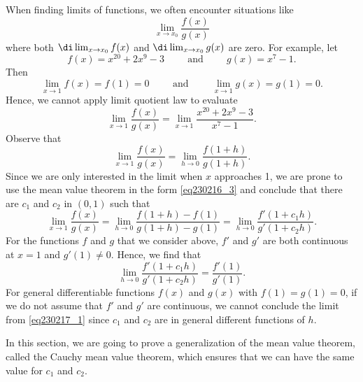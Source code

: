 When finding limits of functions, we often encounter situations like
\[\lim_{x\to x_0}\frac{f(x)}{g(x)}\] where both $\di\lim_{x\to x_0}f(x)$ and $\di\lim_{x\to x_0}g(x)$ are   zero. For example, let  \[f(x)=x^{20}+2x^9-3\hspace{1cm}\text{and} \hspace{1cm} g(x)=x^7-1.\] Then \[\lim_{x\to 1}f(x)=f(1)=0\hspace{1cm}\text{and} \hspace{1cm}\lim_{x\to 1}g(x)=g(1)=0.\] Hence, we cannot apply limit quotient law to evaluate 
\[\lim_{x\to 1}\frac{f(x)}{g(x)}=\lim_{x\to 1}\frac{x^{20}+2x^9-3}{x^7-1}.\]
Observe that 
\[\lim_{x\to 1}\frac{f(x)}{g(x)}=\lim_{h\to 0}\frac{f(1+h)}{g(1+h)}.\] Since we are only interested in the limit when $x$ approaches 1, we are prone to use the mean value theorem in the form \eqref{eq230216_3} and conclude that there are $c_1 $ and $c_2 $ in $(0,1)$ such that
\begin{equation}\label{eq230217_1}\lim_{x\to 1}\frac{f(x)}{g(x)}=\lim_{h\to 0}\frac{f(1+h)-f(1)}{g(1+h)-g(1)} =\lim_{h\to 0}\frac{f'(1+c_1h)}{g'(1+c_2h)}.\end{equation}
For the functions $f$ and $g$ that we consider above, $f'$ and $g'$ are both continuous at $x=1$ and $g'(1)\neq 0$. Hence, we find that
\[\lim_{h\to 0}\frac{f'(1+c_1h)}{g'(1+c_2h)}=\frac{f'(1)}{g'(1)}.\]  For general differentiable functions $f(x)$ and $g(x)$ with $f(1)=g(1)=0$, if we do not assume that $f'$ and $g'$ are continuous, we cannot conclude the limit from \eqref{eq230217_1}  
 since $c_1$ and $c_2$ are in general different functions of $h$.

In this section, we are going to prove a generalization of the mean value theorem, called the Cauchy mean value theorem,  which ensures that we can have the same value for $c_1$ and $c_2$.

 

